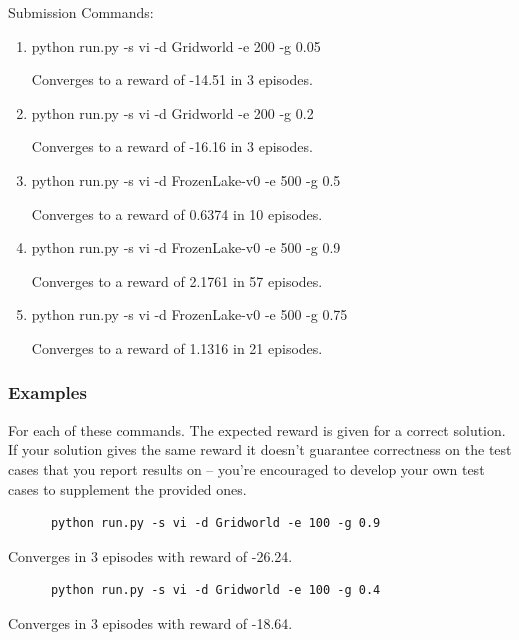 \documentclass[a4paper]{article}
\theoremstyle{definition}
\newenvironment{soln}{
    \leavevmode\color{blue}\ignorespaces
}{}
\begin{document}
\vspace{8mm}

Submission Commands:
\begin{enumerate} 
    \item   python run.py -s vi -d Gridworld -e 200 -g 0.05
        \begin{soln}
            Converges to a reward of -14.51 in 3 episodes.
        \end{soln} 
    \item   python run.py -s vi -d Gridworld -e 200 -g 0.2
        \begin{soln}
            Converges to a reward of -16.16 in 3 episodes.
        \end{soln} 
    \item  python run.py -s vi -d FrozenLake-v0 -e 500 -g 0.5
        \begin{soln}
            Converges to a reward of 0.6374 in 10 episodes.
        \end{soln} 
    \item  python run.py -s vi -d FrozenLake-v0 -e 500 -g 0.9
        \begin{soln}
            Converges to a reward of 2.1761 in 57 episodes.
        \end{soln} 
    \item python run.py -s vi -d FrozenLake-v0 -e 500 -g 0.75
        \begin{soln}
            Converges to a reward of 1.1316 in 21 episodes.
        \end{soln} 
\end{enumerate}
    

\subsubsection*{Examples}

For each of these commands. The expected reward is given for a correct solution. 
If your solution gives the same reward it doesn't guarantee correctness on the test cases that you report results on -- you're encouraged to develop your own test cases to supplement the provided ones.

\begin{verbatim}
      python run.py -s vi -d Gridworld -e 100 -g 0.9  
\end{verbatim}
Converges in 3 episodes with reward of -26.24.

\begin{verbatim}
      python run.py -s vi -d Gridworld -e 100 -g 0.4  
\end{verbatim}
Converges in 3 episodes with reward of -18.64.
\end{document}

